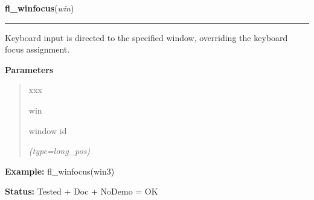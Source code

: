     \vspace{0.5ex}

\hspace{.8\funcindent}\begin{boxedminipage}{\funcwidth}

    \raggedright \textbf{fl\_winfocus}(\textit{win})

    \vspace{-1.5ex}

    \rule{\textwidth}{0.5\fboxrule}
\setlength{\parskip}{2ex}
    Keyboard input is directed to the specified window, overriding the 
    keyboard focus assignment.

\setlength{\parskip}{1ex}
      \textbf{Parameters}
      \vspace{-1ex}

      \begin{quote}
        \begin{Ventry}{xxx}

          \item[win]

          window id

            {\it (type=long\_pos)}

        \end{Ventry}

      \end{quote}

\textbf{Example:} fl\_winfocus(win3)



\textbf{Status:} Tested + Doc + NoDemo = OK



    \end{boxedminipage}

    \label{xformslib:flxbasic:fl_winget}

    \vspace{0.5ex}

